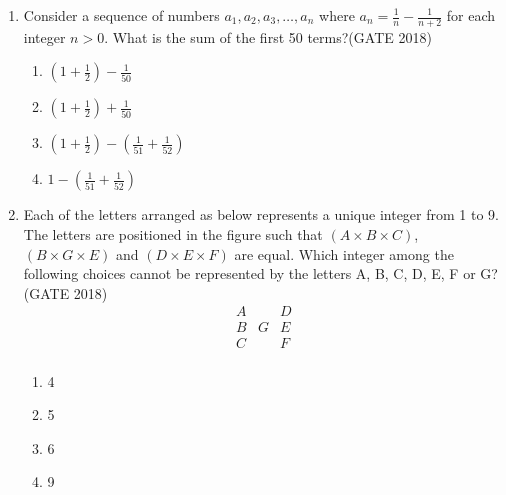 \documentclass[journal,12pt,onecolumn]{IEEEtran}
\theoremstyle{remark}
\begin{document}
\begin{enumerate}
\vspace{1cm}
\newpage
\item Consider a sequence of numbers $a_1, a_2, a_3, \ldots, a_n$ where $a_n = \frac{1}{n} - \frac{1}{n+2}$ for each integer $n > 0$. What is the sum of the first 50 terms?\hfill{(GATE 2018)}
\begin{multicols}{4}
\begin{enumerate}
    \item $\left(1 + \frac{1}{2}\right) - \frac{1}{50}$
    \item $\left(1 + \frac{1}{2}\right) + \frac{1}{50}$
    \item $\left(1 + \frac{1}{2}\right) - \left(\frac{1}{51} + \frac{1}{52}\right)$
    \item $1 - \left(\frac{1}{51} + \frac{1}{52}\right)$
\end{enumerate}
\end{multicols}
\vspace{1cm}

\item Each of the letters arranged as below represents a unique integer from 1 to 9. The letters are positioned in the figure such that $(A \times B \times C)$, $(B \times G \times E)$ and $(D \times E \times F)$ are equal. Which integer among the following choices cannot be represented by the letters A, B, C, D, E, F or G?\hfill{(GATE 2018)}
\[
\begin{array}{ccc}
A &   & D \\
B & G & E \\
C &   & F \\
\end{array}
\]
\begin{multicols}{4}
\begin{enumerate}
    \item 4
    \item 5
    \item 6
    \item 9
\end{enumerate}
\end{multicols}
\vspace{1cm}









\end{enumerate}
\end{document}
